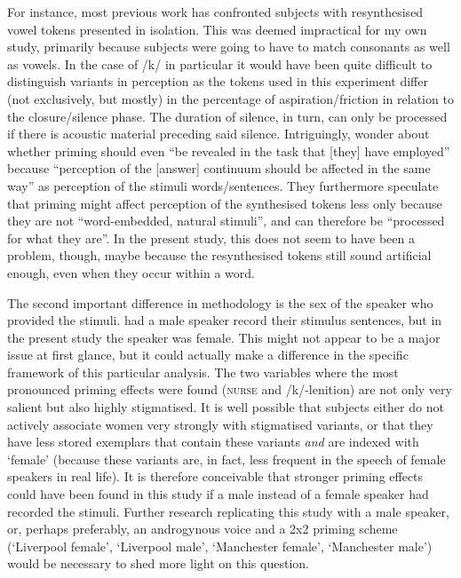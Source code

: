 For instance, most previous work has confronted subjects with resynthesised vowel tokens presented in isolation.
This was deemed impractical for my own study, primarily because subjects were going to have to match consonants as well as vowels.
In the case of /k/ in particular it would have been quite difficult to distinguish variants in perception as the tokens used in this experiment differ (not exclusively, but mostly) in the percentage of aspiration/friction in relation to the closure/silence phase.
The duration of silence, in turn, can only be processed if there is acoustic material preceding said silence.
Intriguingly, \textcite[887--888]{haydrager2010} wonder about whether priming should even ``be revealed in the task that [they] have employed'' because ``perception of the [answer] continuum should be affected in the same way'' as perception of the stimuli words/sentences.
They furthermore speculate that priming might affect perception of the synthesised tokens less only because they are not ``word-embedded, natural stimuli'', and can therefore be ``processed for what they are''.
In the present study, this does not seem to have been a problem, though, maybe because the resynthesised tokens still sound artificial enough, even when they occur within a word.

The second important difference in methodology is the sex of the speaker who provided the stimuli.
\textcite{hayetal2006a,haydrager2010} had a male speaker record their stimulus sentences, but in the present study the speaker was female.
This might not appear to be a major issue at first glance, but it could actually make a difference in the specific framework of this particular analysis.
The two variables where the most pronounced priming effects were found (\textsc{nurse} and /k/-lenition) are not only very salient but also highly stigmatised.
It is well possible that subjects either do not actively associate women very strongly with stigmatised variants, or that they have less stored exemplars that contain these variants \emph{and} are indexed with `female' (because these variants are, in fact, less frequent in the speech of female speakers in real life).
It is therefore conceivable that stronger priming effects could have been found in this study if a male instead of a female speaker had recorded the stimuli.
Further research replicating this study with a male speaker, or, perhaps preferably, an androgynous voice and a 2x2 priming scheme (`Liverpool female', `Liverpool male', `Manchester female', `Manchester male') would be necessary to shed more light on this question.

